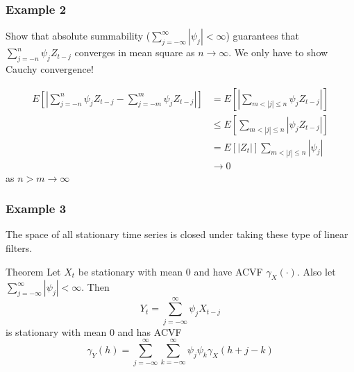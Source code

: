 \documentclass{beamer}
\begin{document}

\begin{frame}
\frametitle{Example 2}

Show that absolute summability ($\sum_{j=-\infty}^{\infty}|\psi_j| < \infty$) guarantees that $\sum_{j=-n}^n \psi_j Z_{t-j}$ converges in mean square as $n \to \infty$. We only have to show Cauchy convergence!
\newline

\begin{align*}
E\left[\left|\sum_{j=-n}^n \psi_j Z_{t-j} -  \sum_{j=-m}^{m} \psi_j Z_{t-j} \right| \right] &= E\left[ \left|\sum_{m < |j| \le n} \psi_j Z_{t-j} \right| \right]\\
&\le E\left[ \sum_{m < |j| \le n} |\psi_j  Z_{t-j} | \right] \tag{tri-ineq.} \\
&= E[|Z_t|] \sum_{m < |j| \le n} |\psi_j| \\
&\to 0
\end{align*}
as $n > m \to \infty$
\end{frame}


% 
% 
% 
% 


\begin{frame}
\frametitle{Example 3}

The space of all stationary time series is closed under taking these type of linear filters.

\begin{block}{Theorem}
Let $X_t$ be stationary with mean $0$ and have ACVF $\gamma_X(\cdot)$. Also let $\sum_{j=-\infty}^{\infty} |\psi_j| < \infty$. Then 
\[
Y_t = \sum_{j=-\infty}^{\infty} \psi_j X_{t-j}
\]
is stationary with mean $0$ and has ACVF
\[
\gamma_Y(h) = \sum_{j=-\infty}^{\infty}\sum_{k=-\infty}^{\infty} \psi_j\psi_k \gamma_X(h+j-k)
\]
\end{block}

\end{frame}
\end{document}
